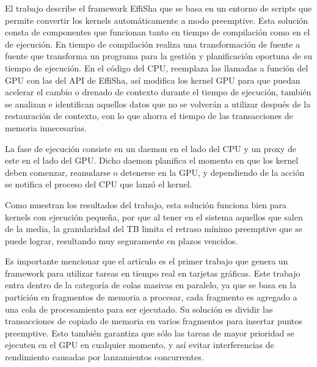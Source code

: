 \begin{enumerate}
El trabajo \cite{Effisha} describe el framework EffiSha que se basa en un entorno de scripts que permite convertir los kernels automáticamente a modo preemptive. Esta solución consta de componentes que funcionan tanto en tiempo de compilación como en el de ejecución. En tiempo de compilación realiza una transformación de fuente a fuente que transforma un programa para la gestión y planificación oportuna de su tiempo de ejecución.
En el código del CPU, reemplaza las llamadas a función del GPU con las del API de EffiSha, así modifica los kernel GPU para que puedan acelerar el cambio o drenado de contexto durante el tiempo de ejecución, también se analizan e identifican aquellos datos que no se volverán a utilizar después de la restauración de contexto, con lo que ahorra el tiempo de las transacciones de memoria innecesarias.

\vspace{0.3cm}

La fase de ejecución consiste en un daemon en el lado del CPU y un proxy de este en el lado del GPU. Dicho daemon planifica el momento en que los kernel deben comenzar, reanudarse o detenerse en la GPU, y dependiendo de la acción se notifica el proceso del CPU que lanzó el kernel.

\vspace{0.3cm}

Como muestran los resultados del trabajo, esta solución funciona bien para kernels con ejecución pequeña, por que al tener en el sistema aquellos que salen de la media, la granularidad del TB limita el retraso mínimo preemptive que se puede lograr, resultando muy seguramente en plazos vencidos.
 
 
 Es importante mencionar que el artículo \cite{RGEM} es el primer trabajo que genera un framework para utilizar tareas en tiempo real en tarjetas gráficas. Este trabajo entra dentro de la categoría de colas masivas en paralelo, ya que se basa en la partición en fragmentos de memoria a procesar, cada fragmento es agregado a una cola de procesamiento para ser ejecutado. Su solución es dividir las transacciones de copiado de memoria en varios fragmentos para insertar puntos preemptive. Esto también garantiza que sólo las tareas de mayor prioridad se ejecuten en el GPU en cualquier momento, y así evitar interferencias de rendimiento causadas por lanzamientos concurrentes.
	
	\vspace{0.3cm}
	

\end{enumerate}
